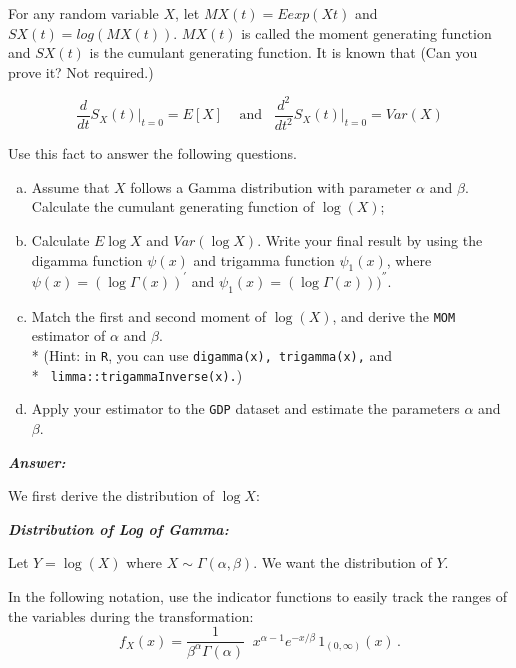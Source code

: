 \documentclass[12pt]{article}
\newenvironment{question}[2][Question]{\begin{trivlist}
\item[\hskip \labelsep {\bfseries #1}\hskip \labelsep {\bfseries #2.}]}{\end{trivlist}}
\begin{document}
\bigskip
\bigskip
\begin{question}{3.4}For any random variable $X$, let $MX(t) = E exp(Xt)$ and $SX(t) = log(MX(t))$. $MX(t)$ is called 
the moment generating function and $SX(t)$ is the cumulant generating function. It is known that (Can you prove it? Not required.)

\begin{center}
$$
\frac{d}{dt} S_X(t) \Big|_{t=0} = E[X] \;\;\; \text{ and} \;\;\; \frac{d^2}{dt^2} S_X(t) \Big|_{t=0} = Var(X) 
$$
\end{center}

Use this fact to answer the following questions.

\begin{enumerate}[(a)]

   \item Assume that $X$ follows a Gamma distribution with parameter $\alpha$ and $\beta$. Calculate the cumulant generating function of $\log (X)$;
   \item Calculate $E \log X$  and $Var(\log X)$. Write your final result by using the digamma function  $\psi (x) $
and trigamma function  $\psi_1 (x) $, where  $\psi (x) = (\log \Gamma(x))^{'}$ and  $\psi_1 (x) = (\log \Gamma(x)))^{''}$.
   \item Match the first and second moment of $\log(X)$, and derive the \texttt{MOM} estimator of $\alpha$ and $\beta$. \\*
(Hint: in \texttt{R}, you can use \texttt{digamma(x), trigamma(x),} and \\* \texttt{ limma::trigammaInverse(x).})

   \item Apply your estimator to the \texttt{GDP} dataset and estimate the parameters $\alpha$  and $\beta$.


\end{enumerate}


\end{question}

 \textbf{\color{TealBlue}\emph{Answer:} } 

We first derive the distribution of $\log X$:


\bigskip

\textbf{\color{TealBlue}\emph{Distribution of Log of Gamma:} } 
\bigskip

Let $Y = \log (X)$ where  $X\sim\Gamma(\alpha,\beta)$.  We want the distribution of $Y$. 

In the following notation, use the indicator functions to easily track the ranges of the variables during the transformation: 
$$ f_X(x) = \frac{1}{\beta^{\alpha}\Gamma(\alpha)} \;\; x^{\alpha-1} e^{-x/\beta} \, 1_{(0,\infty)}(x) \, . $$
\end{document}
